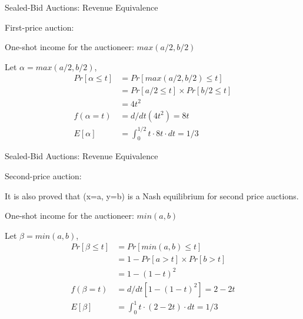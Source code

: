 \documentclass{beamer}
\begin{document}
\begin{frame}{Sealed-Bid Auctions: Revenue Equivalence}
	\begin{exampleblock}{First-price auction:}
	\end{exampleblock}
	
	One-shot income for the auctioneer: $max(a/2, b/2)$
	
	Let $\alpha = max(a/2, b/2)$,
\[
\begin{split}
  Pr[\alpha \leq t]
    & = Pr[max(a/2, b/2) \leq t] \\
    & = Pr[a/2 \leq t] \times Pr[b/2 \leq t] \\
    & = 4t^2 \\
  f(\alpha = t)
    & = d/dt (4t^2) = 8t \\
  E[\alpha]
    & = \int_0^{1/2} t\cdot 8t\cdot dt = 1/3
\end{split}
\]
\end{frame}

\begin{frame}{Sealed-Bid Auctions: Revenue Equivalence}
	\begin{exampleblock}{Second-price auction:}
	\end{exampleblock}
	\alert{It is also proved that (x=a, y=b) is a Nash equilibrium for second price auctions.}
	
	One-shot income for the auctioneer: $min(a, b)$
	
	Let $\beta = min(a, b)$,
\[
\begin{split}
  Pr[\beta \leq t]
    & = Pr[min(a, b) \leq t] \\
    & = 1 - Pr[a > t] \times Pr[b > t] \\
    & = 1- (1-t)^2 \\
  f(\beta = t)
    & = d/dt [1- (1-t)^2] = 2 - 2t \\
  E[\beta]
    & = \int_0^{1} t\cdot (2 - 2t)\cdot dt = 1/3
\end{split}
\]
\end{frame}
\end{document}
